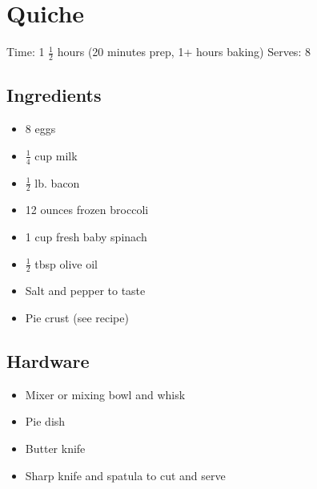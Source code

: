 \section{Quiche}
\label{quiche}
\setcounter{secnumdepth}{0}
Time: 1 \( \frac{1}{2} \) hours (20 minutes prep, 1+ hours baking)
Serves: 8

\begin{multicols}{2}
\subsection*{Ingredients}
\begin{itemize}
    \item 8 eggs
    \item \( \frac{1}{4} \) cup milk
    \item \( \frac{1}{2} \) lb. bacon
    \item 12 ounces frozen broccoli
    \item 1 cup fresh baby spinach
    \item \( \frac{1}{2} \) tbsp olive oil
    \item Salt and pepper to taste
    \item Pie crust (see  recipe)
\end{itemize}

\subsection*{Hardware}
\begin{itemize}
    \item Mixer or mixing bowl and whisk
    \item Pie dish
    \item Butter knife
    \item Sharp knife and spatula to cut and serve
\end{itemize}
\clearpage


\end{multicols}
